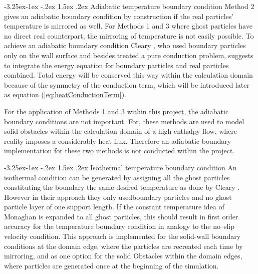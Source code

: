 \documentclass[11pt,a4paper,twoside]{report}
\makeatletter
\renewcommand\paragraph{\@startsection{paragraph}{4}{\z@}%
  {-3.25ex\@plus -1ex \@minus -.2ex}%
  {1.5ex \@plus .2ex}%
  {\normalfont\normalsize\bfseries}}
\makeatother
\begin{document}
\paragraph{Adiabatic temperature boundary condition}
Method 2 gives an adiabatic boundary condition by construction if the real particles' temperature is mirrored as well. 
For Methods 1 and 3 where ghost particles have no direct real counterpart, the mirroring of temperature is not easily possible. To achieve an adiabatic boundary condition Cleary \cite{Cleary1999}, who used boundary particles only on the wall surface and besides treated a pure conduction problem, suggests to integrate the energy equation for boundary particles and real particles combined. Total energy will be conserved this way within the calculation domain because of the symmetry of the conduction term, which will be introduced later as equation (\ref{eq:heatConductionTerm}).

For the application of Methods 1 and 3 within this project, the adiabatic boundary conditions are not important. For, these methods are used to model solid obstacles within the calculation domain of a high enthalpy flow, where reality imposes a considerably heat flux.
Therefore an adiabatic boundary implementation for these two methods is not conducted within the project.

\paragraph{Isothermal temperature boundary condition}
\label{sec:BC_solid_Wall_isothermal}
An isothermal condition can be generated by assigning all the ghost particles constituting the boundary the same desired temperature as done by Cleary \cite{Cleary1999}. However in their approach they only usedboundary particles and no ghost particle layer of one support length. 
If the constant temperature idea of Monaghan is expanded to all ghost particles, this should result in first order accuracy for the temperature boundary condition in analogy to the no--slip velocity condition. This approach is implemented for the solid-wall boundary conditions at the domain edge, where the particles are recreated each time by mirroring, and as one option for the solid Obstacles within the domain edges, where particles are generated once at the beginning of the simulation.
\end{document}
